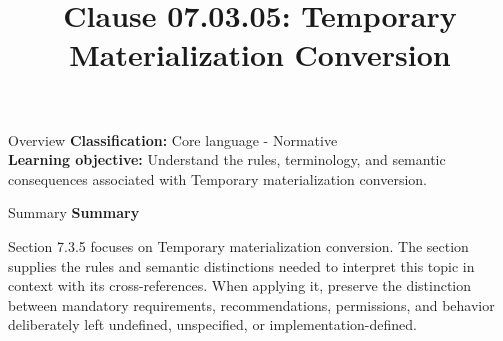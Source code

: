 \documentclass[10pt,letterpaper]{article}
\title{Clause 07.03.05: Temporary Materialization Conversion}
\author{}
\date{}
\begin{document}
\maketitle
\begin{CornellOverviewBox}{Overview}
\textbf{Classification:} Core language - Normative\\[2pt]
\textbf{Learning objective:} Understand the rules, terminology, and semantic consequences associated with Temporary materialization conversion.
\end{CornellOverviewBox}\begin{CornellSummaryBox}{Summary}
{\sffamily\bfseries\color{Accent} Summary}\par\vspace{3pt}Section 7.3.5 focuses on Temporary materialization conversion. The section supplies the rules and semantic distinctions needed to interpret this topic in context with its cross-references. When applying it, preserve the distinction between mandatory requirements, recommendations, permissions, and behavior deliberately left undefined, unspecified, or implementation-defined.
\end{CornellSummaryBox}
\end{document}
